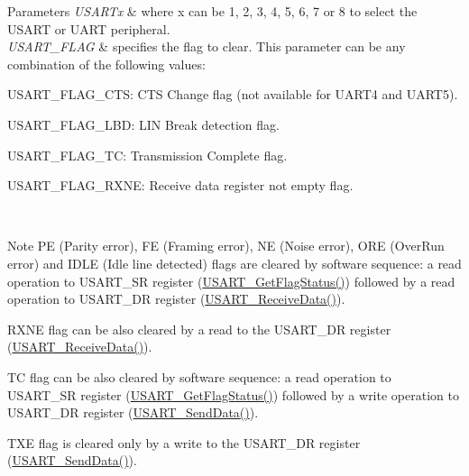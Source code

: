 \begin{DoxyParams}{Parameters}
{\em U\+S\+A\+R\+Tx} & where x can be 1, 2, 3, 4, 5, 6, 7 or 8 to select the U\+S\+A\+RT or U\+A\+RT peripheral. \\
\hline
{\em U\+S\+A\+R\+T\+\_\+\+F\+L\+AG} & specifies the flag to clear. This parameter can be any combination of the following values\+: \begin{DoxyItemize}
\item U\+S\+A\+R\+T\+\_\+\+F\+L\+A\+G\+\_\+\+C\+TS\+: C\+TS Change flag (not available for U\+A\+R\+T4 and U\+A\+R\+T5). \item U\+S\+A\+R\+T\+\_\+\+F\+L\+A\+G\+\_\+\+L\+BD\+: L\+IN Break detection flag. \item U\+S\+A\+R\+T\+\_\+\+F\+L\+A\+G\+\_\+\+TC\+: Transmission Complete flag. \item U\+S\+A\+R\+T\+\_\+\+F\+L\+A\+G\+\_\+\+R\+X\+NE\+: Receive data register not empty flag.\end{DoxyItemize}
\\
\hline
\end{DoxyParams}
\begin{DoxyNote}{Note}
PE (Parity error), FE (Framing error), NE (Noise error), O\+RE (Over\+Run error) and I\+D\+LE (Idle line detected) flags are cleared by software sequence\+: a read operation to U\+S\+A\+R\+T\+\_\+\+SR register (\mbox{\hyperlink{group___u_s_a_r_t___group9_ga144630722defc9e312f0ad280b68e9da}{U\+S\+A\+R\+T\+\_\+\+Get\+Flag\+Status()}}) followed by a read operation to U\+S\+A\+R\+T\+\_\+\+DR register (\mbox{\hyperlink{group___u_s_a_r_t___group2_gac67a91845b0b1d54d31bdfb1c5e9867c}{U\+S\+A\+R\+T\+\_\+\+Receive\+Data()}}). 

R\+X\+NE flag can be also cleared by a read to the U\+S\+A\+R\+T\+\_\+\+DR register (\mbox{\hyperlink{group___u_s_a_r_t___group2_gac67a91845b0b1d54d31bdfb1c5e9867c}{U\+S\+A\+R\+T\+\_\+\+Receive\+Data()}}). 

TC flag can be also cleared by software sequence\+: a read operation to U\+S\+A\+R\+T\+\_\+\+SR register (\mbox{\hyperlink{group___u_s_a_r_t___group9_ga144630722defc9e312f0ad280b68e9da}{U\+S\+A\+R\+T\+\_\+\+Get\+Flag\+Status()}}) followed by a write operation to U\+S\+A\+R\+T\+\_\+\+DR register (\mbox{\hyperlink{group___u_s_a_r_t___group2_ga0b43d42da9540f446d494bf69823c6fb}{U\+S\+A\+R\+T\+\_\+\+Send\+Data()}}). 

T\+XE flag is cleared only by a write to the U\+S\+A\+R\+T\+\_\+\+DR register (\mbox{\hyperlink{group___u_s_a_r_t___group2_ga0b43d42da9540f446d494bf69823c6fb}{U\+S\+A\+R\+T\+\_\+\+Send\+Data()}}).
\end{DoxyNote}

